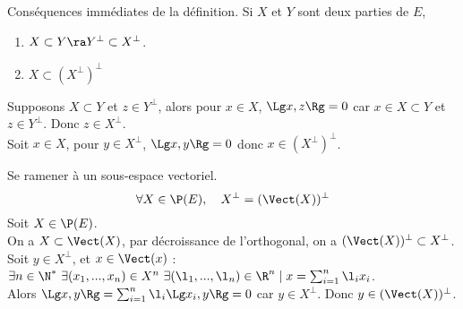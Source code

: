 \documentclass[11pt]{article}
\begin{document}
\begin{ex}{Conséquences immédiates de la définition.}{}
    Si $X$ et $Y$ sont deux parties de $E$,
    \begin{enumerate}[topsep=0pt,itemsep=-0.9 ex]
        \item $X \subset Y \ra Y^\bot \subset X^\bot$.
        \item $X \subset (X^\bot)^\bot$
    \end{enumerate}
    \tcblower
     Supposons $X\subset Y$ et $z\in Y^\bot$, alors pour $x\in X$, $\Lg x, z \Rg = 0$ car $x\in X \subset Y$ et $z \in Y^\bot$. Donc $z\in X^\bot$.\\
     Soit $x\in X$, pour $y\in X^\bot$, $\Lg x, y \Rg = 0$ donc $x\in (X^\bot)^\bot$.
\end{ex}

\begin{ex}{Se ramener à un sous-espace vectoriel.}{}
    \begin{equation*}
        \forall X \in \P(E), \quad X^\bot = (\Vect(X))^\bot
    \end{equation*}
    \tcblower
    Soit $X\in\P(E)$.\\ 
    On a $X\subset\Vect(X)$, par décroissance de l'orthogonal, on a $(\Vect(X))^\bot\subset X^\bot$.\\
    Soit $y\in X^\bot$, et $x\in\Vect(x)$ : $\exists n \in \N^* ~ \exists (x_1,...,x_n)\in X^n ~ \exists (\l_1,...,\l_n) \in \R ^n \mid x = \sum_{i=1}^n\l_ix_i$.\\
    Alors $\Lg x, y \Rg = \sum_{i=1}^n\l_i\Lg x_i, y \Rg = 0$ car $y\in X^\bot$. Donc $y\in(\Vect(X))^\bot$.
\end{ex}
\end{document}
